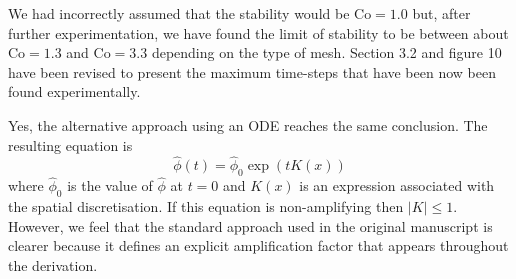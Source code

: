 \documentclass[times]{elsarticle}
\begin{document}
\begin{quotation}
\begin{comment}
\item P14. The calculation of the longest stable timestep {\it assumes} that the stability
limit is given by $\mathrm{Co}=1$. Given the idealized nature of the analysis in
Appendix~A, and that most experiments are done with $\mathrm{Co} \approx 0.4$,
at least some empirical investigation of the stability limit should be discussed
to confirm that it is indeed (exactly or approximately) $\mathrm{Co}=1$.
\end{comment}
\end{quotation}
We had incorrectly assumed that the stability would be $\mathrm{Co} = 1.0$ but, after further experimentation, we have found the limit of stability to be between about $\mathrm{Co} = 1.3$ and $\mathrm{Co} = 3.3$ depending on the type of mesh.  Section 3.2 and figure 10 have been revised to present the maximum time-steps that have been now been found experimentally.

\begin{quotation}
\begin{comment}
\item The presentation of the analysis in Appendix~A is somewhat confusing. It appears
to use a time discretization by introducing a time step $\Delta t$ and an amplification
factor $A$, (and hence a Courant number $v \Delta t / \Delta x$) whereas the
analysis is, in fact, continuous in time. It might be clearer to set
$\phi(x_j , t) = \hat{\phi}(t) \mathrm{e}^{i j k \Delta x}$ and form an ODE for
$\hat{\phi}$, etc. I think the conclusion would be the same.
\end{comment}
\end{quotation}
Yes, the alternative approach using an ODE reaches the same conclusion.  The resulting equation is
\begin{equation*}
	\hat{\phi}(t) = \hat{\phi}_0 \exp(t K(x))
\end{equation*}
where $\hat{\phi}_0$ is the value of $\hat{\phi}$ at $t=0$ and $K(x)$ is an expression associated with the spatial discretisation.  If this equation is non-amplifying then $\lvert K \rvert \leq 1$.  However, we feel that the standard approach used in the original manuscript is clearer because it defines an explicit amplification factor that appears throughout the derivation.
\end{document}
